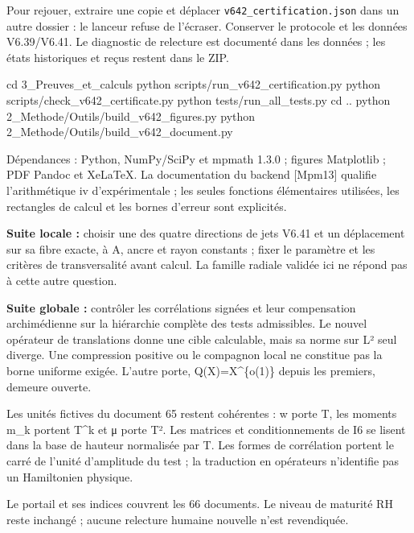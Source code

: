 \documentclass[
  10pt,
  a4paper,
]{article}
\newenvironment{Shaded}{}{}
\newcommand{\BuiltInTok}[1]{\textcolor[rgb]{0.00,0.50,0.00}{#1}}
\newcommand{\ExtensionTok}[1]{#1}
\newcommand{\NormalTok}[1]{#1}
\begin{document}
Pour rejouer, extraire une copie et déplacer
\texttt{v642\_certification.json} dans un autre dossier : le lanceur
refuse de l'écraser. Conserver le protocole et les données V6.39/V6.41.
Le diagnostic de relecture est documenté dans les données ; les états
historiques et reçus restent dans le ZIP.

\begin{Shaded}
\begin{Highlighting}[]
\BuiltInTok{cd}\NormalTok{ 3\_Preuves\_et\_calculs}
\ExtensionTok{python}\NormalTok{ scripts/run\_v642\_certification.py}
\ExtensionTok{python}\NormalTok{ scripts/check\_v642\_certificate.py}
\ExtensionTok{python}\NormalTok{ tests/run\_all\_tests.py}
\BuiltInTok{cd}\NormalTok{ ..}
\ExtensionTok{python}\NormalTok{ 2\_Methode/Outils/build\_v642\_figures.py}
\ExtensionTok{python}\NormalTok{ 2\_Methode/Outils/build\_v642\_document.py}
\end{Highlighting}
\end{Shaded}

Dépendances : Python, NumPy/SciPy et mpmath 1.3.0 ; figures Matplotlib ;
PDF Pandoc et XeLaTeX. La documentation du backend {[}Mpm13{]} qualifie
l'arithmétique iv d'expérimentale ; les seules fonctions élémentaires
utilisées, les rectangles de calcul et les bornes d'erreur sont
explicités.

\textbf{Suite locale :} choisir une des quatre directions de jets V6.41
et un déplacement sur sa fibre exacte, à A, ancre et rayon constants ;
fixer le paramètre et les critères de transversalité avant calcul. La
famille radiale validée ici ne répond pas à cette autre question.

\textbf{Suite globale :} contrôler les corrélations signées et leur
compensation archimédienne sur la hiérarchie complète des tests
admissibles. Le nouvel opérateur de translations donne une cible
calculable, mais sa norme sur L² seul diverge. Une compression positive
ou le compagnon local ne constitue pas la borne uniforme exigée. L'autre
porte, Q(X)=X\^{}\{o(1)\} depuis les premiers, demeure ouverte.

Les unités fictives du document 65 restent cohérentes : w porte T, les
moments m\_k portent T\^{}k et μ porte T². Les matrices et
conditionnements de I6 se lisent dans la base de hauteur normalisée par
T. Les formes de corrélation portent le carré de l'unité d'amplitude du
test ; la traduction en opérateurs n'identifie pas un Hamiltonien
physique.

Le portail et ses indices couvrent les 66 documents. Le niveau de
maturité RH reste inchangé ; aucune relecture humaine nouvelle n'est
revendiquée.
\end{document}
